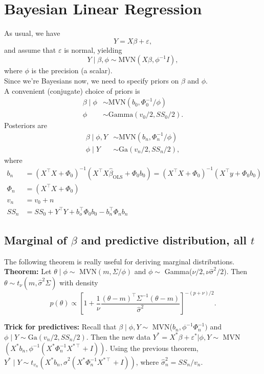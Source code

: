 \documentclass[letterpaper,11pt]{article}
\renewcommand{\t}{^\intercal} %
\newcommand{\1}{\mathbf{1}} %
\begin{document}
\section{Bayesian Linear Regression}
As usual, we have
$$
Y = X\beta + \varepsilon,
$$
and assume that $\varepsilon$ is normal, yielding
$$
Y \mid \beta, \phi \sim \text{MVN}(X \beta, \phi^{-1} I),
$$
where $\phi$ is the precision (a scalar). \\

Since we're Bayesians now, we need to specify priors on $\beta$ and $\phi$. \\

A convenient (conjugate) choice of priors is
\begin{align*}
\beta \mid \phi &\sim \text{MVN}(b_0, \Phi^{-1}_0/\phi) \\
\phi &\sim \text{Gamma}(v_0/2, SS_0/2).
\end{align*} 
Posteriors are
\begin{align*}
\beta \mid \phi, Y &\sim \text{MVN}(b_n, \Phi_n^{-1}/\phi) \\
\phi \mid Y &\sim \text{Ga}(v_n/2,  SS_n/2),
\end{align*}
where
\begin{align*}
b_n &= (X \t X + \Phi_0)^{-1} (X \t X
\hat{\beta}_{\mathrm{OLS}} + \Phi_0 b_0) = (X \t X + \Phi_0)^{-1} (X \t y +
\Phi_0 b_0) \\
\Phi_n &= (X \t X + \Phi_0) \\
v_n &= v_0+n \\
SS_n &= SS_0 +  Y \t Y + b_o\t \Phi_0 b_0 - b_n \t \Phi_n b_n  
\end{align*}
\subsection{Marginal of $\beta$  and predictive distribution, all $t$}

The following theorem is really useful for deriving marginal
distributions. \\

\textbf{Theorem:} Let $\theta \mid \phi \sim$ MVN$(m, \Sigma/\phi)$ and $\phi
\sim $ Gamma($\nu/2, \nu \hat{\sigma}^2/2$). Then $\theta \sim
t_{\nu}(m, \hat{\sigma}^2\Sigma)$ with density
$$
p(\theta) \propto \left[ 1 + \frac{1}{\nu} \frac{(\theta-m)^\intercal
    \Sigma^{-1} (\theta - m) }{\hat{\sigma}^2} \right]^{-(p+\nu)/2}.
$$

\textbf{Trick for predictives:} Recall that $\beta \mid \phi, Y \sim$
MVN($b_n, \phi^{-1} \Phi^{-1}_n)$ and $\phi \mid Y \sim \text{Ga}(v_n/2,  SS_n/2)$. Then the new data $Y^\ast = X^\ast \beta + \varepsilon^\ast |
\phi, Y \sim$ MVN$(X^\ast b_n,  \phi^{-1} (X^\ast \Phi^{-1}_n X^{\ast
  \intercal} + I))$. Using the previous theorem, $Y^\ast \mid Y \sim
t_{v_n}(X^\ast b_n, \hat{\sigma}^2(X^\ast \Phi^{-1}_n X^{\ast
  \intercal}+I))$, where $\hat{\sigma}^2_n = SS_n/v_n$.
\end{document}
